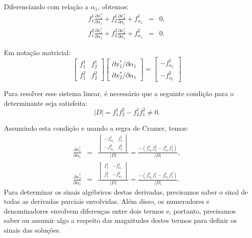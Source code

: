 \documentclass[12pt]{article}
\begin{document}
Diferenciando com relação a $\alpha_1$, obtemos:
\begin{eqnarray*}
    f_1^1 \frac{\partial x_1^*}{\partial \alpha_1} + f_2^1 \frac{\partial x_2^*}{\partial \alpha_1} + f^1_{\alpha_1} &=& 0, \\
    f_1^2 \frac{\partial x_1^*}{\partial \alpha_1} + f_2^2 \frac{\partial x_2^*}{\partial \alpha_1} + f^2_{\alpha_1} &=& 0.
\end{eqnarray*}

Em notação matricial:
\begin{equation*}
    \begin{bmatrix}
        f_1^1 & f_2^1 \\ f_1^2 & f_2^2
    \end{bmatrix} \begin{bmatrix}
        \partial x_1^*/\partial \alpha_1 \\ 
        \partial x_2^*/\partial \alpha_1
    \end{bmatrix} = \begin{bmatrix}
        -f_{\alpha_1}^1 \\ -f_{\alpha_1}^2
    \end{bmatrix}
\end{equation*}

Para resolver esse sistema linear, é necessário que a seguinte condição para o  determinante seja satisfeita:
\[
|D| = f_1^1 f_2^2 - f_2^1 f_1^2 \neq 0.
\]

Assumindo esta condição e usando a regra de Cramer, temos:
\begin{eqnarray*}
    \frac{\partial x_1^*}{\partial \alpha_1} &=& \frac{\begin{vmatrix}
        -f_{\alpha_1}^1 & f_2^1 \\ -f_{\alpha_1}^2 & f_2^2
    \end{vmatrix}}{|D|} = \frac{-(f_{\alpha_1}^1f_2^2 - f_{\alpha_1}^2f_2^1)}{|D|}, \\
    \frac{\partial x_2^*}{\partial \alpha_1} &=& \frac{\begin{vmatrix}
        f_1^1 & -f_{\alpha_1}^1  \\ f_1^2 & -f_{\alpha_1}^2 
    \end{vmatrix}}{|D|} = \frac{-(f_{\alpha_1}^2f_1^1 - f_{\alpha_1}^1f_1^2)}{|D|}.
\end{eqnarray*}
Para determinar os sinais algébricos destas derivadas, precisamos saber o sinal de todas as derivadas parciais envolvidas. Além disso, os numeradores e denominadores envolvem diferenças entre dois termos e, portanto, precisamos saber ou assumir algo a respeito das magnitudes destes termos para definir os sinais das soluções.
\end{document}
